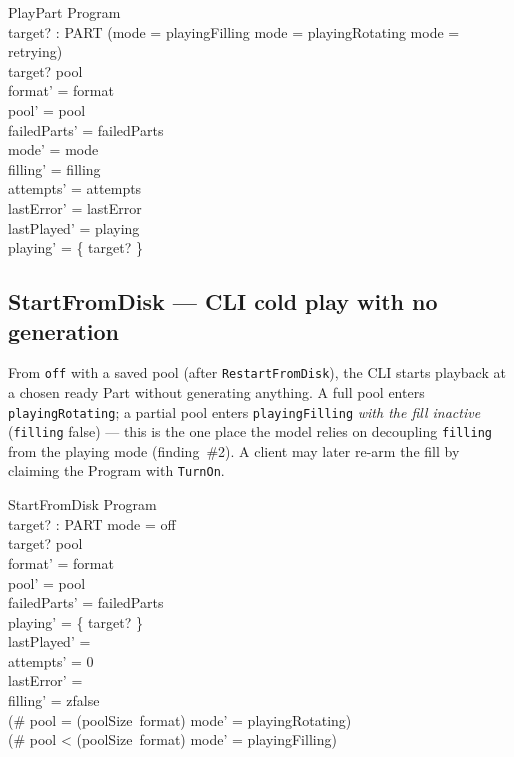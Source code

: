 \documentclass[a4paper,10pt,fleqn]{article}
\begin{document}
\begin{schema}{PlayPart}
  \Delta Program \\
  target? : PART
  \where
  (mode = playingFilling \lor mode = playingRotating \lor mode = retrying) \\
  target? \in pool \\
  format' = format \\
  pool' = pool \\
  failedParts' = failedParts \\
  mode' = mode \\
  filling' = filling \\
  attempts' = attempts \\
  lastError' = lastError \\
  lastPlayed' = playing \\
  playing' = \{ target? \}
\end{schema}

\subsection{StartFromDisk --- CLI cold play with no generation}

From \texttt{off} with a saved pool (after \texttt{RestartFromDisk}), the CLI
starts playback at a chosen ready Part without generating anything. A full pool
enters \texttt{playingRotating}; a partial pool enters \texttt{playingFilling}
\emph{with the fill inactive} (\texttt{filling} false) --- this is the one place
the model relies on decoupling \texttt{filling} from the playing mode
(finding~\#2). A client may later re-arm the fill by claiming the Program with
\texttt{TurnOn}.

\begin{schema}{StartFromDisk}
  \Delta Program \\
  target? : PART
  \where
  mode = off \\
  target? \in pool \\
  format' = format \\
  pool' = pool \\
  failedParts' = failedParts \\
  playing' = \{ target? \} \\
  lastPlayed' = \emptyset \\
  attempts' = 0 \\
  lastError' = \emptyset \\
  filling' = zfalse \\
  (\# pool = (poolSize~format) \implies mode' = playingRotating) \\
  (\# pool < (poolSize~format) \implies mode' = playingFilling)
\end{schema}
\end{document}
